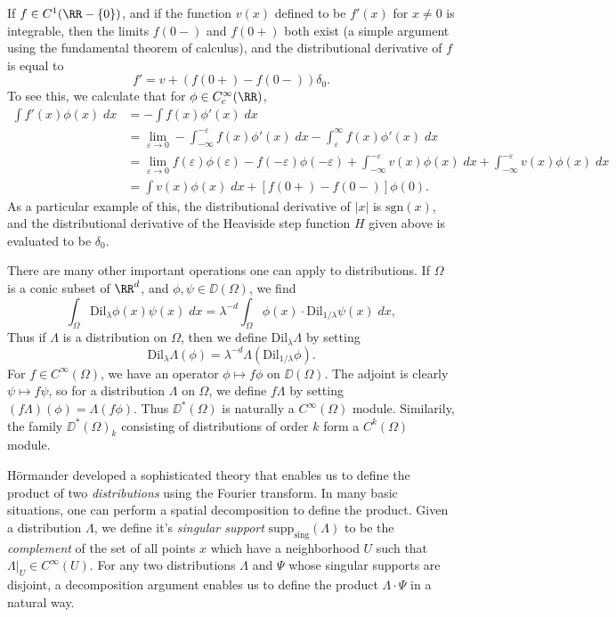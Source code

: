 \begin{example}
    If $f \in C^1(\RR - \{ 0 \})$, and if the function $v(x)$ defined to be $f'(x)$ for $x \neq 0$ is integrable, then the limits $f(0-)$ and $f(0+)$ both exist (a simple argument using the fundamental theorem of calculus), and the distributional derivative of $f$ is equal to
    \[ f' = v + (f(0+) - f(0-)) \delta_0. \]
    To see this, we calculate that for $\phi \in C_c^\infty(\RR)$,
    \begin{align*}
        \int f'(x) \phi(x)\; dx &= -\int f(x) \phi'(x)\; dx\\
        &= \lim_{\varepsilon \to 0} - \int_{-\infty}^{-\varepsilon} f(x) \phi'(x)\; dx - \int_\varepsilon^\infty f(x) \phi'(x)\; dx\\
        &= \lim_{\varepsilon \to 0} f(\varepsilon) \phi(\varepsilon) - f(-\varepsilon) \phi(-\varepsilon) + \int_{-\infty}^{-\varepsilon} v(x) \phi(x)\; dx + \int_{-\infty}^{-\varepsilon} v(x) \phi(x)\; dx\\
        &= \int v(x) \phi(x)\; dx + [f(0+) - f(0-)] \phi(0).
    \end{align*}
    As a particular example of this, the distributional derivative of $|x|$ is $\text{sgn}(x)$, and the distributional derivative of the Heaviside step function $H$ given above is evaluated to be $\delta_0$.
\end{example}

There are many other important operations one can apply to distributions. If $\Omega$ is a conic subset of $\RR^d$, and $\phi,\psi \in \DD(\Omega)$, we find
%
\[ \int_{\Omega} \text{Dil}_\lambda \phi(x) \psi(x)\; dx = \lambda^{-d} \int_{\Omega} \phi(x) \cdot \text{Dil}_{1/\lambda} \psi(x)\; dx, \]
%
Thus if $\Lambda$ is a distribution on $\Omega$, then we define $\text{Dil}_\lambda \Lambda$ by setting
%
\[ \text{Dil}_\lambda \Lambda (\phi) = \lambda^{-d} \Lambda( \text{Dil}_{1/\lambda} \phi). \]
%
For $f \in C^\infty(\Omega)$, we have an operator $\phi \mapsto f \phi$ on $\DD(\Omega)$. The adjoint is clearly $\psi \mapsto f \psi$, so for a distribution $\Lambda$ on $\Omega$, we define $f \Lambda$ by setting $(f\Lambda)(\phi) = \Lambda(f \phi)$. Thus $\DD^*(\Omega)$ is naturally a $C^\infty(\Omega)$ module. Similarily, the family $\DD^*(\Omega)_k$ consisting of distributions of order $k$ form a $C^k(\Omega)$ module.

\begin{remark}
    H\"{o}rmander developed a sophisticated theory that enables us to define the product of two \emph{distributions} using the Fourier transform. In many basic situations, one can perform a spatial decomposition to define the product. Given a distribution $\Lambda$, we define it's \emph{singular support} $\text{supp}_{\text{sing}}(\Lambda)$ to be the \emph{complement} of the set of all points $x$ which have a neighborhood $U$ such that $\Lambda|_U \in C^\infty(U)$. For any two distributions $\Lambda$ and $\Psi$ whose singular supports are disjoint, a decomposition argument enables us to define the product $\Lambda \cdot \Psi$ in a natural way.
\end{remark}

